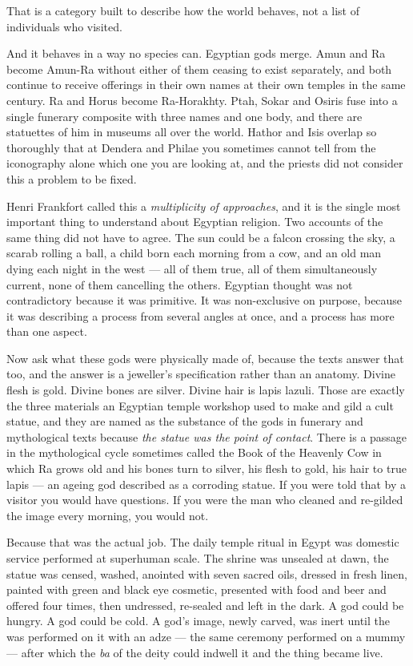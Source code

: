 That is a category built to describe how the world behaves, not a list of individuals who visited.

And it behaves in a way no species can. Egyptian gods merge. Amun and Ra become Amun-Ra without
either of them ceasing to exist separately, and both continue to receive offerings in their own
names at their own temples in the same century. Ra and Horus become Ra-Horakhty. Ptah, Sokar and
Osiris fuse into a single funerary composite with three names and one body, and there are
statuettes of him in museums all over the world. Hathor and Isis overlap so thoroughly that at
Dendera and Philae you sometimes cannot tell from the iconography alone which one you are looking
at, and the priests did not consider this a problem to be fixed.

Henri Frankfort called this a \emph{multiplicity of approaches}, and it is the single most
important thing to understand about Egyptian religion. Two accounts of the same thing did not have
to agree. The sun could be a falcon crossing the sky, a scarab rolling a ball, a child born each
morning from a cow, and an old man dying each night in the west --- all of them true, all of them
simultaneously current, none of them cancelling the others. Egyptian thought was not
contradictory because it was primitive. It was non-exclusive on purpose, because it was describing
a process from several angles at once, and a process has more than one aspect. 

Now ask what these gods were physically made of, because the texts answer that too, and the answer
is a jeweller's specification rather than an anatomy. Divine flesh is gold. Divine bones are
silver. Divine hair is lapis lazuli. Those are exactly the three materials an Egyptian temple
workshop used to make and gild a cult statue, and they are named as the substance of the gods in
funerary and mythological texts because \emph{the statue was the point of contact}. There is a
passage in the mythological cycle sometimes called the Book of the Heavenly Cow in which Ra grows
old and his bones turn to silver, his flesh to gold, his hair to true lapis --- an ageing god
described as a corroding statue. If you were told that by a visitor you would have questions. If
you were the man who cleaned and re-gilded the image every morning, you would not.

Because that was the actual job. The daily temple ritual in Egypt was domestic service performed
at superhuman scale. The shrine was unsealed at dawn, the statue was censed, washed, anointed with
seven sacred oils, dressed in fresh linen, painted with green and black eye cosmetic, presented
with food and beer and offered four times, then undressed, re-sealed and left in the dark. A god
could be hungry. A god could be cold. A god's image, newly carved, was inert until the
 was performed on it with an adze --- the same ceremony performed on a
mummy --- after which the \emph{ba} of the deity could indwell it and the thing became live.

